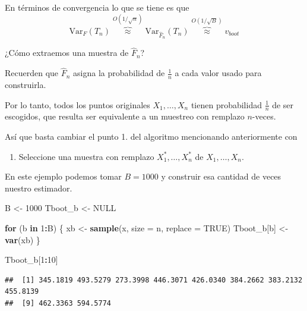 \documentclass[
  12pt,
]{book}
\newenvironment{Shaded}{\begin{snugshade}}{\end{snugshade}}
\newcommand{\ControlFlowTok}[1]{\textcolor[rgb]{0.13,0.29,0.53}{\textbf{#1}}}
\newcommand{\DataTypeTok}[1]{\textcolor[rgb]{0.13,0.29,0.53}{#1}}
\newcommand{\DecValTok}[1]{\textcolor[rgb]{0.00,0.00,0.81}{#1}}
\newcommand{\KeywordTok}[1]{\textcolor[rgb]{0.13,0.29,0.53}{\textbf{#1}}}
\newcommand{\NormalTok}[1]{#1}
\newcommand{\OperatorTok}[1]{\textcolor[rgb]{0.81,0.36,0.00}{\textbf{#1}}}
\newcommand{\OtherTok}[1]{\textcolor[rgb]{0.56,0.35,0.01}{#1}}
\newcommand{\StringTok}[1]{\textcolor[rgb]{0.31,0.60,0.02}{#1}}
\providecommand{\tightlist}{%
  \setlength{\itemsep}{0pt}\setlength{\parskip}{0pt}}
\theoremstyle{definition}
\theoremstyle{definition}
\theoremstyle{definition}
\theoremstyle{remark}
\let\BeginKnitrBlock\begin \let\EndKnitrBlock\end
\begin{document}
En términos de convergencia lo que se tiene es que
\[
\mathrm{Var}_{F}\left(T_{n}\right) \overbrace{\approx}^{O(1 / \sqrt{n})} \mathrm{Var}_{\widehat{F}_{n}}\left(T_{n}\right) \overbrace{\approx}^{O(1 / \sqrt{B})} v_{b o o t}
\]

\BeginKnitrBlock{remark}
{}¿Cómo extraemos una muestra de \(\hat{F}_n\)?
\EndKnitrBlock{remark}

Recuerden que \(\hat{F}_{n}\) asigna la probabilidad de \(\frac{1}{n}\) a cada valor usado para construirla.

Por lo tanto, todos los puntos originales \(X_{1},\ldots,X_{n}\) tienen probabilidad \(\frac{1}{n}\) de ser escogidos, que resulta ser equivalente a un muestreo con remplazo \(n\)-veces.

Así que basta cambiar el punto 1. del algoritmo mencionando anteriormente con

\begin{enumerate}
\def\labelenumi{\arabic{enumi}.}
\tightlist
\item
  Seleccione una muestra con remplazo \(X_{1}^{*}, \ldots, X_{n}^{*}\) de \(X_{1},\ldots,X_{n}\).
\end{enumerate}

\BeginKnitrBlock{exercise}
\protect\hypertarget{exr:unnamed-chunk-87}{}{\label{exr:unnamed-chunk-87} }En este ejemplo podemos tomar \(B=1000\) y construir esa cantidad de veces nuestro estimador.
\EndKnitrBlock{exercise}

\begin{Shaded}
\begin{Highlighting}[]
\NormalTok{B <-}\StringTok{ }\DecValTok{1000}
\NormalTok{Tboot_b <-}\StringTok{ }\OtherTok{NULL}

\ControlFlowTok{for}\NormalTok{ (b }\ControlFlowTok{in} \DecValTok{1}\OperatorTok{:}\NormalTok{B) \{}
\NormalTok{    xb <-}\StringTok{ }\KeywordTok{sample}\NormalTok{(x, }\DataTypeTok{size =}\NormalTok{ n, }\DataTypeTok{replace =} \OtherTok{TRUE}\NormalTok{)}
\NormalTok{    Tboot_b[b] <-}\StringTok{ }\KeywordTok{var}\NormalTok{(xb)}
\NormalTok{\}}

\NormalTok{Tboot_b[}\DecValTok{1}\OperatorTok{:}\DecValTok{10}\NormalTok{]}
\end{Highlighting}
\end{Shaded}

\begin{verbatim}
##  [1] 345.1819 493.5279 273.3998 446.3071 426.0340 384.2662 383.2132 455.8139
##  [9] 462.3363 594.5774
\end{verbatim}
\end{document}
